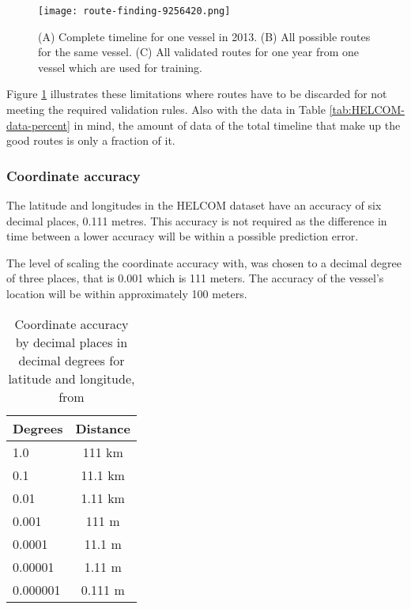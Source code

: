 \documentclass[../main.tex]{subfiles}
\begin{document}
\begin{figure}[H]
	\centering
	\texttt{[image: route-finding-9256420.png]}
	\caption{(A) Complete timeline for one vessel in 2013. (B) All possible routes for the same vessel. (C) All validated routes for one year from one vessel which are used for training. }
	\label{fig:route-finding}
\end{figure}

Figure \ref{fig:route-finding} illustrates these limitations where routes have to be discarded for not meeting the required validation rules. Also with the data in Table \ref{tab:HELCOM-data-percent} in mind, the amount of data of the total timeline that make up the good routes is only a fraction of it.

\subsubsection{Coordinate accuracy}

The latitude and longitudes in the HELCOM dataset have an accuracy of six decimal places, 0.111 metres. This accuracy is not required as the difference in time between a lower accuracy will be within a possible prediction error.

The level of scaling the coordinate accuracy with, was chosen to a decimal degree of three places, that is 0.001 which is 111 meters. The accuracy of the vessel's location will be within approximately 100 meters.

\begin{table}[H]
\centering
\begin{tabular}{|l|c|}
\hline
\rowcolor[HTML]{C0C0C0} 
\textbf{Degrees} & \multicolumn{1}{l|}{\cellcolor[HTML]{C0C0C0}\textbf{Distance}} \\ \hline
1.0              & 111 km                                                         \\ \hline
0.1              & 11.1 km                                                        \\ \hline
0.01             & 1.11 km                                                        \\ \hline
0.001            & 111 m                                                          \\ \hline
0.0001           & 11.1 m                                                         \\ \hline
0.00001          & 1.11 m                                                         \\ \hline
0.000001          & 0.111 m                                                         \\ \hline
\end{tabular}
\caption{Coordinate accuracy by decimal places in decimal degrees for latitude and longitude, from \cite{GIS_2011}}
\label{tab:gis-accuracy}
\end{table}
\end{document}
